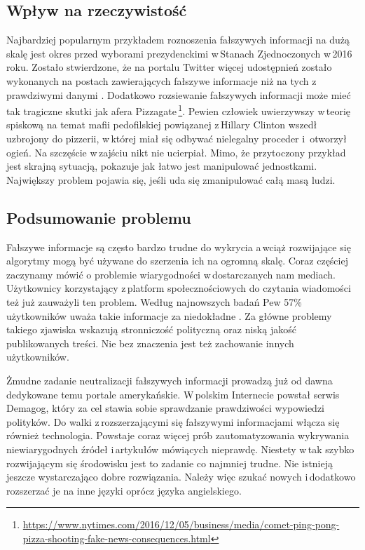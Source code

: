 \subsection{Wpływ na rzeczywistość}
Najbardziej popularnym przykładem roznoszenia fałszywych informacji na dużą skalę jest okres przed wyborami prezydenckimi w\,Stanach Zjednoczonych w\,2016 roku. Zostało stwierdzone, że na portalu Twitter więcej udostępnień zostało wykonanych na postach zawierających fałszywe informacje niż na tych z\,prawdziwymi danymi  \cite{neudertpolarization2018}. Dodatkowo rozsiewanie fałszywych informacji może mieć tak tragiczne skutki jak afera Pizzagate\,\footnote{\url{https://www.nytimes.com/2016/12/05/business/media/comet-ping-pong-pizza-shooting-fake-news-consequences.html}}. Pewien człowiek uwierzywszy w\,teorię spiskową na temat mafii pedofilskiej powiązanej z\,Hillary Clinton wszedł uzbrojony do pizzerii, w\,której miał się odbywać nielegalny proceder i \,otworzył ogień. Na szczęście w\,zajściu nikt nie ucierpiał. Mimo, że przytoczony przykład jest skrajną sytuacją, pokazuje jak łatwo jest manipulować jednostkami. Największy problem pojawia się, jeśli uda się zmanipulować całą masą ludzi. 
\subsection{Podsumowanie problemu}
Fałszywe informacje są często bardzo trudne do wykrycia a\,wciąż rozwijające się algorytmy mogą być używane do szerzenia ich na ogromną skalę. Coraz częściej zaczynamy mówić o problemie wiarygodności w\,dostarczanych nam mediach. Użytkownicy korzystający z\,platform społecznościowych do czytania wiadomości też już zauważyli ten problem. Według najnowszych badań Pew 57\% użytkowników uważa takie informacje za niedokładne \cite{PewNewsUse2018}. Za główne problemy takiego zjawiska wskazują stronniczość polityczną oraz niską jakość publikowanych treści. Nie bez znaczenia jest też zachowanie innych użytkowników. 
\par Żmudne zadanie neutralizacji fałszywych informacji prowadzą już od dawna dedykowane temu portale amerykańskie. W\,polskim Internecie powstał serwis Demagog, który za cel stawia sobie sprawdzanie prawdziwości wypowiedzi polityków. Do walki z\,rozszerzającymi się fałszywymi informacjami włącza się również technologia. Powstaje coraz więcej prób zautomatyzowania wykrywania niewiarygodnych źródeł i\,artykułów mówiących nieprawdę. Niestety w\,tak szybko rozwijającym się środowisku jest to zadanie co najmniej trudne. Nie istnieją jeszcze wystarczająco dobre rozwiązania. Należy więc szukać nowych i\,dodatkowo rozszerzać je na inne języki oprócz języka angielskiego. 
